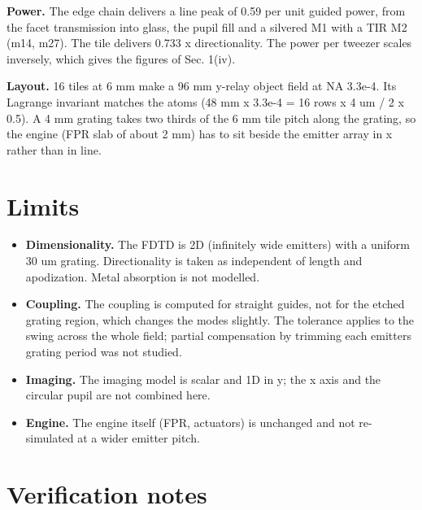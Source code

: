 \textbf{Power.} The edge chain delivers a line peak of 0.59 per unit
guided power, from the facet transmission into glass, the pupil fill and
a silvered M1 with a TIR M2 (m14, m27). The tile delivers 0.733 x
directionality. The power per tweezer scales inversely, which gives the
figures of Sec. 1(iv).

\textbf{Layout.} 16 tiles at 6 mm make a 96 mm y-relay object field at
NA 3.3e-4. Its Lagrange invariant matches the atoms (48 mm x 3.3e-4 = 16
rows x 4 um / 2 x 0.5). A 4 mm grating takes two thirds of the 6 mm tile
pitch along the grating, so the engine (FPR slab of about 2 mm) has to
sit beside the emitter array in x rather than in line.

\hypertarget{5-limits}{%
\section{Limits}\label{planar_tile-5-limits}}

\begin{itemize}
\tightlist
\item
  \textbf{Dimensionality.} The FDTD is 2D (infinitely wide emitters)
  with a uniform 30 um grating. Directionality is taken as independent
  of length and apodization. Metal absorption is not modelled.
\item
  \textbf{Coupling.} The coupling is computed for straight guides, not
  for the etched grating region, which changes the modes slightly. The
  tolerance applies to the swing across the whole field; partial
  compensation by trimming each emitter\textquotesingle s grating period
  was not studied.
\item
  \textbf{Imaging.} The imaging model is scalar and 1D in y; the x axis
  and the circular pupil are not combined here.
\item
  \textbf{Engine.} The engine itself (FPR, actuators) is unchanged and
  not re-simulated at a wider emitter pitch.
\end{itemize}

\hypertarget{verification-notes}{%
\section{Verification notes}\label{planar_tile-verification-notes}}

